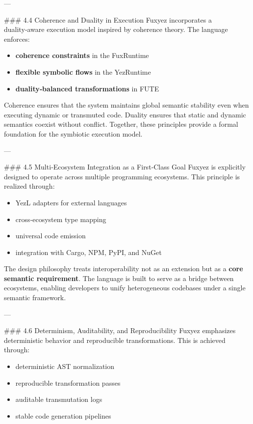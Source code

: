 \documentclass[12pt, a4paper]{book}
\begin{document}
---

\#\#\# 4.4 Coherence and Duality in Execution  
Fuxyez incorporates a duality‑aware execution model inspired by coherence theory. The language enforces:

\begin{itemize}
  \item \textbf{coherence constraints} in the FuxRuntime  
  \item \textbf{flexible symbolic flows} in the YezRuntime  
  \item \textbf{duality‑balanced transformations} in FUTE  
\end{itemize}

Coherence ensures that the system maintains global semantic stability even when executing dynamic or transmuted code. Duality ensures that static and dynamic semantics coexist without conflict. Together, these principles provide a formal foundation for the symbiotic execution model.

---

\#\#\# 4.5 Multi‑Ecosystem Integration as a First‑Class Goal  
Fuxyez is explicitly designed to operate across multiple programming ecosystems. This principle is realized through:

\begin{itemize}
  \item YezL adapters for external languages  
  \item cross‑ecosystem type mapping  
  \item universal code emission  
  \item integration with Cargo, NPM, PyPI, and NuGet  
\end{itemize}

The design philosophy treats interoperability not as an extension but as a \textbf{core semantic requirement}. The language is built to serve as a bridge between ecosystems, enabling developers to unify heterogeneous codebases under a single semantic framework.

---

\#\#\# 4.6 Determinism, Auditability, and Reproducibility  
Fuxyez emphasizes deterministic behavior and reproducible transformations. This is achieved through:

\begin{itemize}
  \item deterministic AST normalization  
  \item reproducible transformation passes  
  \item auditable transmutation logs  
  \item stable code generation pipelines  
\end{itemize}
\end{document}
